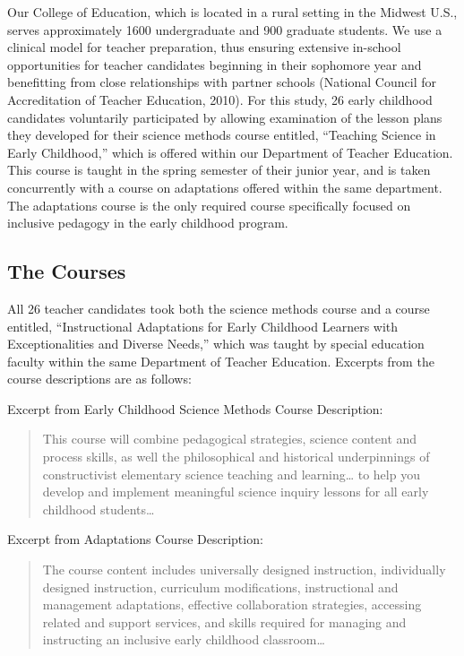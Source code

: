 \documentclass[11.5pt]{sig-alternate} %
\begin{document}
\begin{large}
Our College of Education, which is located in a rural setting in the Midwest U.S., serves approximately 1600 undergraduate and 900 graduate students. We use a clinical model for teacher preparation, thus ensuring extensive in-school opportunities for teacher candidates beginning in their sophomore year and benefitting from close relationships with partner schools (National Council for Accreditation of Teacher Education, 2010). For this study, 26 early childhood candidates voluntarily participated by allowing examination of the lesson plans they developed for their science methods course entitled, “Teaching Science in Early Childhood,” which is offered within our Department of Teacher Education. This course is taught in the spring semester of their junior year, and is taken concurrently with a course on adaptations offered within the same department. The adaptations course is the only required course specifically focused on inclusive pedagogy in the early childhood program. 

\subsection*{The Courses}

All 26 teacher candidates took both the science methods course and a course entitled, “Instructional Adaptations for Early Childhood Learners with Exceptionalities and Diverse Needs,” which was taught by special education faculty within the same Department of Teacher Education.  Excerpts from the course descriptions are as follows: 

Excerpt from Early Childhood Science Methods Course Description: 

\begin{quote}
This course will combine pedagogical strategies, science content and process skills, as well the philosophical and historical underpinnings of constructivist elementary science teaching and learning… to help you develop and implement meaningful science inquiry  lessons for all early childhood students… 
\end{quote}

Excerpt from Adaptations Course Description:

\begin{quote}
The course content includes universally designed instruction, individually designed instruction, curriculum modifications, instructional and management adaptations, effective collaboration strategies, accessing related and support services, and skills required for managing and instructing an inclusive early childhood classroom… 
\end{quote}


\end{large}
\end{document}
